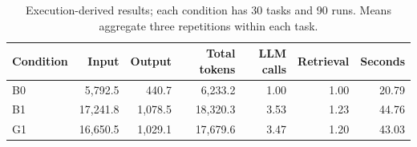 \begin{table}[!ht]
\centering
\small
\caption[Execution-derived results; each condition has 30 tasks and 90 runs]{Execution-derived results; each condition has 30 tasks and 90 runs. Means aggregate three repetitions within each task.}
\label{tab:execution-overall}
\begin{tabular}{lrrrrrr}
\toprule
Condition & Input & Output & Total tokens & LLM calls & Retrieval & Seconds \\
\midrule
B0 & 5,792.5 & 440.7 & 6,233.2 & 1.00 & 1.00 & 20.79 \\
B1 & 17,241.8 & 1,078.5 & 18,320.3 & 3.53 & 1.23 & 44.76 \\
G1 & 16,650.5 & 1,029.1 & 17,679.6 & 3.47 & 1.20 & 43.03 \\
\bottomrule
\end{tabular}
\end{table}
